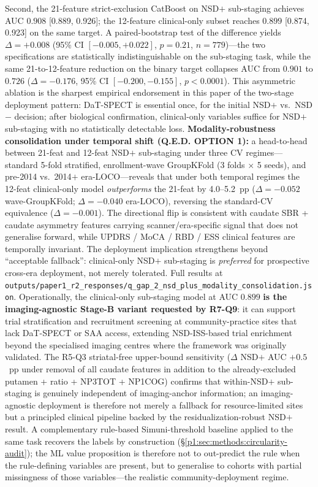 Second, the 21-feature strict-exclusion CatBoost on NSD$+$ sub-staging achieves AUC $0.908$ [0.889, 0.926]; the 12-feature clinical-only subset reaches $0.899$ [0.874, 0.923] on the same target. A paired-bootstrap test of the difference yields $\Delta{=}+0.008$ (95\% CI $[-0.005, +0.022]$, $p{=}0.21$, $n{=}779$)---the two specifications are statistically indistinguishable on the sub-staging task, while the same 21-to-12-feature reduction on the binary target collapses AUC from $0.901$ to $0.726$ ($\Delta{=}-0.176$, 95\% CI $[-0.200, -0.155]$, $p{<}0.0001$). This asymmetric ablation is the sharpest empirical endorsement in this paper of the two-stage deployment pattern: DaT-SPECT is essential once, for the initial NSD$+$ vs.\ NSD$-$ decision; after biological confirmation, clinical-only variables suffice for NSD$+$ sub-staging with no statistically detectable loss. \textbf{Modality-robustness consolidation under temporal shift (Q.E.D. OPTION 1):} a head-to-head between 21-feat and 12-feat NSD$+$ sub-staging under three CV regimes---standard 5-fold stratified, enrollment-wave GroupKFold (3 folds $\times$ 5 seeds), and pre-2014 vs.\ 2014$+$ era-LOCO---reveals that under both temporal regimes the 12-feat clinical-only model \emph{outperforms} the 21-feat by 4.0--5.2~pp ($\Delta{=}{-}0.052$ wave-GroupKFold; $\Delta{=}{-}0.040$ era-LOCO), reversing the standard-CV equivalence ($\Delta{=}{-}0.001$). The directional flip is consistent with caudate SBR + caudate asymmetry features carrying scanner/era-specific signal that does not generalise forward, while UPDRS / MoCA / RBD / ESS clinical features are temporally invariant. The deployment implication strengthens beyond ``acceptable fallback'': clinical-only NSD$+$ sub-staging is \emph{preferred} for prospective cross-era deployment, not merely tolerated. Full results at \texttt{outputs/paper1\_r2\_responses/q\_gap\_2\_nsd\_plus\_modality\_consolidation.json}. Operationally, the clinical-only sub-staging model at AUC $0.899$ \textbf{is the imaging-agnostic Stage-B variant requested by R7-Q9}: it can support trial stratification and recruitment screening at community-practice sites that lack DaT-SPECT or SAA access, extending NSD-ISS-based trial enrichment beyond the specialised imaging centres where the framework was originally validated. The R5-Q3 striatal-free upper-bound sensitivity ($\Delta$ NSD$+$ AUC $+0.5$~pp under removal of all caudate features in addition to the already-excluded putamen + ratio + NP3TOT + NP1COG) confirms that within-NSD$+$ sub-staging is genuinely independent of imaging-anchor information; an imaging-agnostic deployment is therefore not merely a fallback for resource-limited sites but a principled clinical pipeline backed by the residualization-robust NSD$+$ result. A complementary rule-based Simuni-threshold baseline applied to the same task recovers the labels by construction (\S\ref{p1:sec:methods:circularity-audit}); the ML value proposition is therefore not to out-predict the rule when the rule-defining variables are present, but to generalise to cohorts with partial missingness of those variables---the realistic community-deployment regime.

